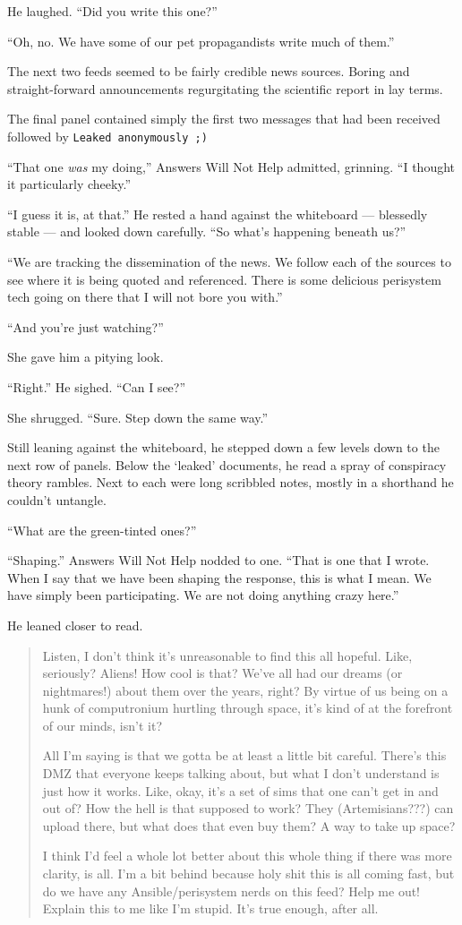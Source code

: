 He laughed. ``Did you write this one?''

``Oh, no. We have some of our pet propagandists write much of them.''

The next two feeds seemed to be fairly credible news sources. Boring and straight-forward announcements regurgitating the scientific report in lay terms.

The final panel contained simply the first two messages that had been received followed by \texttt{Leaked\ anonymously\ ;)}

``That one \emph{was} my doing,'' Answers Will Not Help admitted, grinning. ``I thought it particularly cheeky.''

``I guess it is, at that.'' He rested a hand against the whiteboard — blessedly stable — and looked down carefully. ``So what's happening beneath us?''

``We are tracking the dissemination of the news. We follow each of the sources to see where it is being quoted and referenced. There is some delicious perisystem tech going on there that I will not bore you with.''

``And you're just watching?''

She gave him a pitying look.

``Right.'' He sighed. ``Can I see?''

She shrugged. ``Sure. Step down the same way.''

Still leaning against the whiteboard, he stepped down a few levels down to the next row of panels. Below the `leaked' documents, he read a spray of conspiracy theory rambles. Next to each were long scribbled notes, mostly in a shorthand he couldn't untangle.

``What are the green-tinted ones?''

``Shaping.'' Answers Will Not Help nodded to one. ``That is one that I wrote. When I say that we have been shaping the response, this is what I mean. We have simply been participating. We are not doing anything crazy here.''

He leaned closer to read.

\begin{quote}
Listen, I don't think it's unreasonable to find this all hopeful. Like, seriously? Aliens! How cool is that? We've all had our dreams (or nightmares!) about them over the years, right? By virtue of us being on a hunk of computronium hurtling through space, it's kind of at the forefront of our minds, isn't it?

All I'm saying is that we gotta be at least a little bit careful. There's this DMZ that everyone keeps talking about, but what I don't understand is just how it works. Like, okay, it's a set of sims that one can't get in and out of? How the hell is that supposed to work? They (Artemisians???) can upload there, but what does that even buy them? A way to take up space?

I think I'd feel a whole lot better about this whole thing if there was more clarity, is all. I'm a bit behind because holy shit this is all coming fast, but do we have any Ansible/perisystem nerds on this feed? Help me out! Explain this to me like I'm stupid. It's true enough, after all.
\end{quote}

